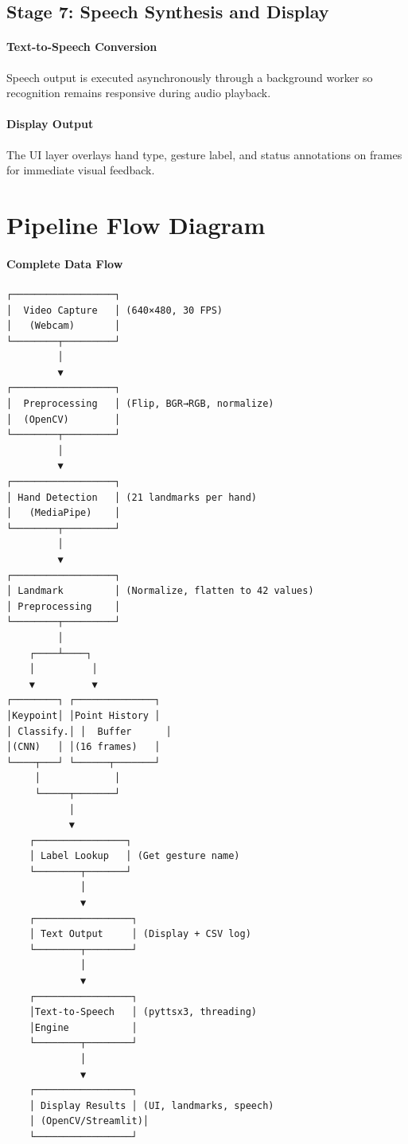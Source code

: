 \subsection{Stage 7: Speech Synthesis and Display}

\paragraph{Text-to-Speech Conversion}
Speech output is executed asynchronously through a background worker so recognition remains responsive during audio playback.

\paragraph{Display Output}
The UI layer overlays hand type, gesture label, and status annotations on frames for immediate visual feedback.

\section{Pipeline Flow Diagram}

\paragraph{Complete Data Flow}

\begin{verbatim}
┌──────────────────┐
│  Video Capture   │ (640×480, 30 FPS)
│   (Webcam)       │
└────────┬─────────┘
         │
         ▼
┌──────────────────┐
│  Preprocessing   │ (Flip, BGR→RGB, normalize)
│  (OpenCV)        │
└────────┬─────────┘
         │
         ▼
┌──────────────────┐
│ Hand Detection   │ (21 landmarks per hand)
│   (MediaPipe)    │
└────────┬─────────┘
         │
         ▼
┌──────────────────┐
│ Landmark         │ (Normalize, flatten to 42 values)
│ Preprocessing    │
└────────┬─────────┘
         │
    ┌────┴────┐
    │          │
    ▼          ▼
┌────────┐ ┌──────────────┐
│Keypoint│ │Point History │
│ Classify.│ │  Buffer      │
│(CNN)   │ │(16 frames)   │
└────┬───┘ └──────┬───────┘
     │             │
     └─────┬───────┘
           │
           ▼
    ┌────────────────┐
    │ Label Lookup   │ (Get gesture name)
    └────────┬───────┘
             │
             ▼
    ┌─────────────────┐
    │ Text Output     │ (Display + CSV log)
    └────────┬────────┘
             │
             ▼
    ┌─────────────────┐
    │Text-to-Speech   │ (pyttsx3, threading)
    │Engine           │
    └────────┬────────┘
             │
             ▼
    ┌─────────────────┐
    │ Display Results │ (UI, landmarks, speech)
    │ (OpenCV/Streamlit)│
    └─────────────────┘
\end{verbatim}

